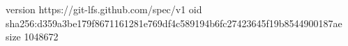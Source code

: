 version https://git-lfs.github.com/spec/v1
oid sha256:d359a3be179f8671161281e769df4c589194b6fc27423645f19b8544900187ae
size 1048672
